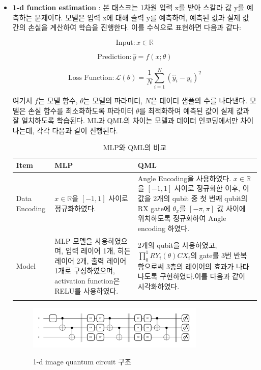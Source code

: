 \begin{itemize}
        \item \textbf{1-d function estimation} :
본 태스크는 1차원 입력 x를 받아 스칼라 값 y를 예측하는 문제이다. 모델은 입력 x에 대해 출력 y를 예측하며, 예측된 값과 실제 값 간의 손실을 계산하여 학습을 진행한다. 이를 수식으로 표현하면 다음과 같다:

\[
\text{Input}: x \in \mathbb{R}
\]

\[
\text{Prediction}: \hat{y} = f(x; \theta)
\]

\[
\text{Loss Function}: \mathcal{L}(\theta) = \frac{1}{N} \sum_{i=1}^{N} (\hat{y}_i - y_i)^2
\]

여기서 \(f\)는 모델 함수, \(\theta\)는 모델의 파라미터, \(N\)은 데이터 샘플의 수를 나타낸다. 모델은 손실 함수를 최소화하도록 파라미터 \(\theta\)를 최적화하여 예측된 값이 실제 값과 잘 일치하도록 학습된다. ML과 QML의 차이는 모델과 데이터 인코딩에서만 차이나는데, 각각 다음과 같이 진행된다.


\begin{table}[ht]
    \centering
    \begin{tabular}{ l||p{5.5cm}||p{5.5cm}}
    \Xhline{3\arrayrulewidth}
    \textbf{Item} & \textbf{MLP} & \textbf{QML} \\
    \hline
    Data Encoding & $x \in \mathbb{R}$을 $[-1, 1]$ 사이로 정규화하였다. &
    Angle Encoding을 사용하였다. $x \in \mathbb{R}$을 $[-1, 1]$ 사이로 정규화한 이후, 이 값을 2개의 qubit 중 첫 번째 qubit의 RX gate에 $\theta_x$를 $[-\pi, \pi]$ 값 사이에 위치하도록 정규화하여 Angle encoding 하였다. \\
    \hline
    Model & MLP 모델을 사용하였으며, 입력 레이어 1개, 히든 레이어 2개, 출력 레이어 1개로 구성하였으며, activation function은 RELU를 사용하였다. &
    2개의 qubit을 사용하였고, $\prod_{0}^{1} RY_i(\theta)CX_i$의 gate를 3번 반복함으로써 3층의 레이어의 효과가 나타나도록 구현하였다.이를 다음과 같이 시각화하였다.{fig:1d-image} \\
    \Xhline{3\arrayrulewidth}
    \end{tabular}
    \caption{MLP와 QML의 비교}
    \label{tab:mlp_qml_comparison_1d}
\end{table}

\begin{figure}[h]
    \centering
    \includegraphics[width=0.8\textwidth]{figs/pqc_1d}\
\caption{1-d image quantum circuit 구조}
\label{fig:1d-image}
\end{figure}
\end{itemize}

